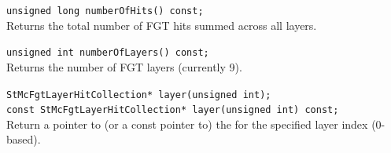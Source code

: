 \begin{Entry}
    \verb+unsigned long numberOfHits() const;+\\
    Returns the total number of FGT hits summed across all layers.

    \verb+unsigned int numberOfLayers() const;+\\
    Returns the number of FGT layers (currently 9).

    \verb+StMcFgtLayerHitCollection* layer(unsigned int);+\\
    \verb+const StMcFgtLayerHitCollection* layer(unsigned int) const;+\\
    Return a pointer to (or a const pointer to) the
     for the specified layer index
    (0-based).

\end{Entry}
\clearpage
%
%
